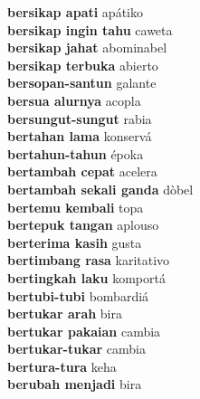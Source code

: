 \textbf{ bersikap apati  } apátiko \\
\textbf{ bersikap ingin tahu  } caweta \\
\textbf{ bersikap jahat  } abominabel \\
\textbf{ bersikap terbuka  } abierto \\
\textbf{ bersopan-santun  } galante \\
\textbf{ bersua alurnya  } acopla \\
\textbf{ bersungut-sungut  } rabia \\
\textbf{ bertahan lama  } konservá \\
\textbf{ bertahun-tahun  } époka \\
\textbf{ bertambah cepat  } acelera \\
\textbf{ bertambah sekali ganda  } dòbel \\
\textbf{ bertemu kembali  } topa \\
\textbf{ bertepuk tangan  } aplouso \\
\textbf{ berterima kasih  } gusta \\
\textbf{ bertimbang rasa  } karitativo \\
\textbf{ bertingkah laku  } komportá \\
\textbf{ bertubi-tubi  } bombardiá \\
\textbf{ bertukar arah  } bira \\
\textbf{ bertukar pakaian  } cambia \\
\textbf{ bertukar-tukar  } cambia \\
\textbf{ bertura-tura  } keha \\
\textbf{ berubah menjadi  } bira \\

